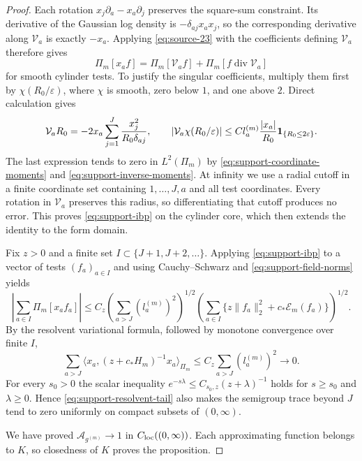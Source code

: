\begin{proof}
Each rotation $x_j\partial_a-x_a\partial_j$ preserves the square-sum
constraint.  Its derivative of the Gaussian log density is
$-\delta_{aj}x_ax_j$, so the corresponding derivative along
$\mathcal V_a$ is exactly $-x_a$.  Applying
\eqref{eq:source-23} with the coefficients defining $\mathcal V_a$
therefore gives
\begin{equation}\label{eq:support-ibp}
 \Pi_m[x_af]=\Pi_m[\mathcal V_a f]
                   +\Pi_m[f\operatorname{div}\mathcal V_a]
\end{equation}
for smooth cylinder tests.  To justify the singular coefficients,
multiply them first by $\chi(R_0/\varepsilon)$, where $\chi$ is smooth,
zero below $1$, and one above $2$.  Direct calculation gives
\[
 \mathcal V_aR_0
  =-2x_a\sum_{j=1}^J\frac{x_j^2}{R_0\delta_{aj}},\qquad
 |\mathcal V_a\chi(R_0/\varepsilon)|
  \le C l_a^{(m)}\frac{|x_a|}{R_0}
           \mathbf 1_{\{R_0\le2\varepsilon\}}.
\]
The last expression tends to zero in $L^2(\Pi_m)$ by
\eqref{eq:support-coordinate-moments} and
\eqref{eq:support-inverse-moments}.  At infinity we use a radial cutoff
in a finite coordinate set containing $1,\ldots,J,a$ and all test
coordinates.  Every rotation in $\mathcal V_a$ preserves this radius,
so differentiating that cutoff produces no error.  This proves
\eqref{eq:support-ibp} on the cylinder core, which then extends the
identity to the form domain.

Fix $z>0$ and a finite set $I\subset\{J+1,J+2,\ldots\}$.  Applying
\eqref{eq:support-ibp} to a vector of tests $(f_a)_{a\in I}$ and
using Cauchy--Schwarz and \eqref{eq:support-field-norms} yields
\[
 \left|\sum_{a\in I}\Pi_m[x_af_a]\right|
 \le C_z\left(\sum_{a>J}(l_a^{(m)})^2\right)^{1/2}
       \left(\sum_{a\in I}
          \{z\|f_a\|_2^2+c_*\mathcal E_m(f_a)\}\right)^{1/2}.
\]
By the resolvent variational formula, followed by monotone convergence
over finite $I$,
\begin{equation}\label{eq:support-resolvent-tail}
 \sum_{a>J}\langle x_a,(z+c_*H_m)^{-1}x_a\rangle_{\Pi_m}
       \le C_z\sum_{a>J}(l_a^{(m)})^2\longrightarrow0.
\end{equation}
For every $s_0>0$ the scalar inequality
$e^{-s\lambda}\le C_{s_0,z}(z+\lambda)^{-1}$ holds for
$s\ge s_0$ and $\lambda\ge0$.  Hence
\eqref{eq:support-resolvent-tail} also makes the semigroup trace
beyond $J$ tend to zero uniformly on compact subsets of $(0,\infty)$.

We have proved $\mathcal A_{g^{(m)}}\to1$ in
$C_{\rm loc}((0,\infty))$.  Each approximating function belongs to
$K$, so closedness of $K$ proves the proposition.
\end{proof}
